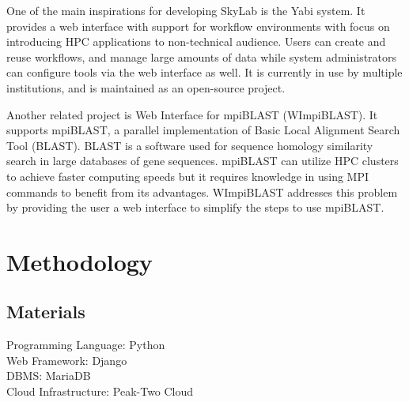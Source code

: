 	    One of the main inspirations for developing SkyLab is the Yabi system. It provides a web interface with support for workflow environments with focus on introducing HPC applications to non-technical audience. Users can create and reuse workflows, and manage large amounts of data while system administrators can configure tools via the web interface as well. It is currently in use by multiple institutions, and is maintained as an open-source project\cite{7411021620120101}.	    	    
	    
        
        
        Another related project is Web Interface for mpiBLAST (WImpiBLAST). It supports mpiBLAST, a parallel implementation of Basic Local Alignment Search Tool (BLAST). BLAST is a software used for sequence homology similarity search in large databases of gene sequences. mpiBLAST can utilize HPC clusters to achieve faster computing speeds but it requires knowledge in using MPI commands to benefit from its advantages. WImpiBLAST addresses this problem by providing the user a web interface to simplify the steps to use mpiBLAST\cite{9686120720140601}.   
            
	        
        
\section{Methodology}
   \subsection {Materials}
    \begin{description}
      \item[Programming Language: Python ]
      \item[Web Framework: Django ]
      \item[DBMS: MariaDB]
      \item[Cloud Infrastructure: Peak-Two Cloud ]
    \end{description}


